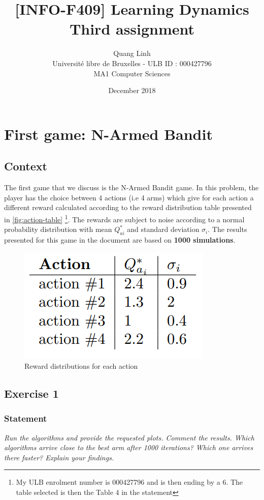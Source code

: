 \documentclass{article}
\title{[INFO-F409] Learning Dynamics \\ Third assignment}
\author{\bsc{BUI QUANG PHUONG} Quang Linh \\ Université libre de Bruxelles - ULB ID : 000427796  \\ MA1 Computer Sciences}
\date{December 2018}
\begin{document}
\maketitle

\tableofcontents

\newpage
\section{First game: N-Armed Bandit}

\subsection*{Context}
The first game that we discuss is the N-Armed Bandit game. In this problem, the player has the choice between 4 actions (i.e 4 arms) which give for each action a different reward calculated according to the reward distribution table presented in \autoref{fig:action-table} \footnote{My ULB enrolment number is 000427796 and is then ending by a 6. The table selected is then the Table 4 in the statement}. The rewards are subject to noise according to a normal probability distribution with mean $Q^{*}_{ai}$ and standard deviation $\sigma_{i}$. The results presented for this game in the document are based on \textbf{1000 simulations}. 

\begin{figure}[H]
  \centering
  \includegraphics[scale=0.4]{fig/action-table.png}
  \caption{Reward distributions for each action}
  \label{fig:action-table}
\end{figure}


\subsection{Exercise 1}

\subsubsection*{Statement}
\textit{Run the algorithms and provide the requested plots. Comment the results. Which algorithms arrive close to the best arm after 1000 iterations? Which one arrives there faster? Explain your findings.} 
\end{document}
